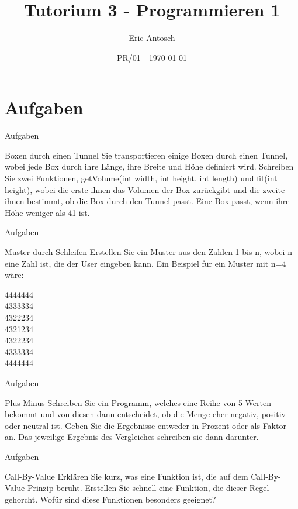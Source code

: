 \documentclass[usenames,dvipsnames,10pt]{beamer}
\title{Tutorium 3 - Programmieren 1}
\date[ISPN ’80]{PR/01 - \today}
\author{Eric Antosch}
\begin{document}
    
    \begin{frame}
        \titlepage
    \end{frame}    
    \section{Aufgaben}
    \begin{frame}{Aufgaben}
        \begin{block}{Boxen durch einen Tunnel}
          Sie transportieren einige Boxen durch einen Tunnel, wobei jede Box durch ihre Länge, ihre Breite und Höhe definiert wird. Schreiben Sie zwei Funktionen, getVolume(int width, int height, int length) und fit(int height), wobei die erste ihnen das Volumen der Box zurückgibt und die zweite ihnen bestimmt, ob die Box durch den Tunnel passt. Eine Box passt, wenn ihre Höhe weniger als 41 ist.
        \end{block}
    \end{frame}
    \begin{frame}{Aufgaben}
        \begin{block}{Muster durch Schleifen}
          Erstellen Sie ein Muster aus den Zahlen 1 bis n, wobei n eine Zahl ist, die der User eingeben kann.
          Ein Beispiel für ein Muster mit n=4 wäre:
          \begin{center}
            4444444\\
            4333334\\
            4322234\\
            4321234\\
            4322234\\
            4333334\\
            4444444
          \end{center}
        \end{block}
    \end{frame}

    \begin{frame}{Aufgaben}
      \begin{block}{Plus Minus}
        Schreiben Sie ein Programm, welches eine Reihe von 5 Werten bekommt und von diesen dann entscheidet, ob die Menge eher negativ, positiv oder neutral ist. Geben Sie die Ergebnisse entweder in Prozent oder als Faktor an.
        Das jeweilige Ergebnis des Vergleiches schreiben sie dann darunter.
        \end{block}
      \end{frame}


    \begin{frame}{Aufgaben}
        \begin{block}{Call-By-Value}
            Erklären Sie kurz, was eine Funktion ist, die auf dem Call-By-Value-Prinzip beruht. Erstellen Sie schnell eine Funktion, die dieser Regel
            gehorcht. Wofür sind diese Funktionen besonders geeignet?
        \end{block}
    \end{frame}
\end{document}

